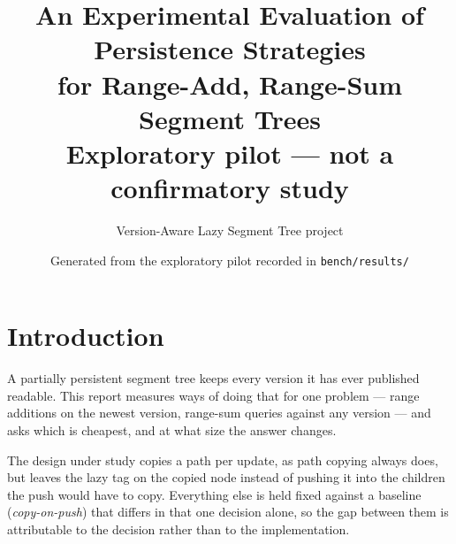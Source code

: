\documentclass[11pt,a4paper]{article}
\title{\bfseries An Experimental Evaluation of Persistence Strategies\\[2pt]
for Range-Add, Range-Sum Segment Trees\\[4pt]
{\large Exploratory pilot --- not a confirmatory study}}
\author{Version-Aware Lazy Segment Tree project}
\date{Generated from the exploratory pilot recorded in \texttt{bench/results/}}
\begin{document}
\maketitle

\noindent{}
\medskip

\section{Introduction}

A partially persistent segment tree keeps every version it has ever published
readable. This report measures  ways of doing that for one
problem --- range additions on the newest version, range-sum queries against any
version --- and asks which is cheapest, and at what size the answer changes.

The design under study copies a path per update, as path copying always does, but
leaves the lazy tag on the copied node instead of pushing it into the children the
push would have to copy. Everything else is held fixed against a baseline
(\emph{copy-on-push}) that differs in that one decision alone, so the gap between
them is attributable to the decision rather than to the implementation.
\end{document}
